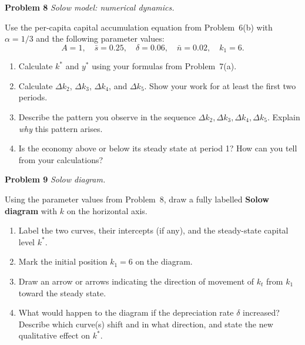 \documentclass[12pt]{article}
\begin{document}
\bigskip

\noindent\textbf{Problem 8} \quad \textit{Solow model: numerical dynamics.}

\medskip
Use the per-capita capital accumulation equation from Problem~6(b)
with $\alpha = 1/3$ and the following parameter values:
\[
  A = 1,\quad \bar{s} = 0.25,\quad \delta = 0.06,\quad \bar{n} = 0.02,
  \quad k_1 = 6.
\]

\begin{enumerate}[label=(\alph*),leftmargin=2em,itemsep=4pt]
  \item Calculate $k^*$ and $y^*$ using your formulas from Problem~7(a).
  \item Calculate $\Delta k_2$, $\Delta k_3$, $\Delta k_4$, and
        $\Delta k_5$.  Show your work for at least the first two periods.
  \item Describe the pattern you observe in the sequence
        $\Delta k_2,\Delta k_3,\Delta k_4,\Delta k_5$.
        Explain \emph{why} this pattern arises.
  \item Is the economy above or below its steady state at period 1?
        How can you tell from your calculations?
\end{enumerate}

\bigskip
\newpage
\noindent\textbf{Problem 9} \quad \textit{Solow diagram.}

\medskip
Using the parameter values from Problem~8, draw a fully labelled
\textbf{Solow diagram} with $k$ on the horizontal axis.

\begin{enumerate}[label=(\alph*),leftmargin=2em,itemsep=4pt]
  \item Label the two curves, their intercepts (if any), and the
        steady-state capital level $k^*$.
  \item Mark the initial position $k_1 = 6$ on the diagram.
  \item Draw an arrow or arrows indicating the direction of movement
        of $k_t$ from $k_1$ toward the steady state.
  \item What would happen to the diagram if the depreciation rate
        $\delta$ increased?  Describe which curve(s) shift and in
        what direction, and state the new qualitative effect on $k^*$.
\end{enumerate}

\bigskip
\end{document}

